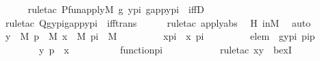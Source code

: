 \begin{isabellebody}
\ \ \ \ \isamarkupfalse%
\ {\isacharparenleft}{\kern0pt}rule{\isacharunderscore}{\kern0pt}tac\ P{\isacharequal}{\kern0pt}{\isachardoublequoteopen}fun{\isacharunderscore}{\kern0pt}apply{\isacharparenleft}{\kern0pt}{\isacharhash}{\kern0pt}{\isacharhash}{\kern0pt}M{\isacharcomma}{\kern0pt}\ g{\isacharcomma}{\kern0pt}\ y{\isacharunderscore}{\kern0pt}pi{\isacharcomma}{\kern0pt}\ g{\isacharunderscore}{\kern0pt}app{\isacharunderscore}{\kern0pt}y{\isacharunderscore}{\kern0pt}pi{\isacharparenright}{\kern0pt}{\isachardoublequoteclose}\ \ iffD{}{\isacharparenright}{\kern0pt}\isanewline
\ \ \ \ \isamarkupfalse%
\ {\isacharparenleft}{\kern0pt}rule{\isacharunderscore}{\kern0pt}tac\ Q{\isacharequal}{\kern0pt}{\isachardoublequoteopen}g{\isacharbackquote}{\kern0pt}y{\isacharunderscore}{\kern0pt}pi{\isacharequal}{\kern0pt}g{\isacharunderscore}{\kern0pt}app{\isacharunderscore}{\kern0pt}y{\isacharunderscore}{\kern0pt}pi{\isachardoublequoteclose}\ \ iff{\isacharunderscore}{\kern0pt}trans{\isacharparenright}{\kern0pt}\isanewline
\ \ \ \ \isamarkupfalse%
\ {\isacharparenleft}{\kern0pt}rule{\isacharunderscore}{\kern0pt}tac\ apply{\isacharunderscore}{\kern0pt}abs{\isacharparenright}{\kern0pt}\ \isamarkupfalse%
\ H\ inM\ \isamarkupfalse%
\ auto\isanewline
\ \ \isamarkupfalse%
\ {\isachardoublequoteopen}{\isacharparenleft}{\kern0pt}{\isasymexists}y\ {\isasymin}\ M{\isachardot}{\kern0pt}\ {\isasymexists}p\ {\isasymin}\ M{\isachardot}{\kern0pt}\ {\isasymexists}x\ {\isasymin}\ M{\isachardot}{\kern0pt}\ {\isasymexists}pi\ {\isasymin}\ M{\isachardot}{\kern0pt}\ \isanewline
\ \ \ \ \ \ \ \ x{\isacharunderscore}{\kern0pt}pi\ {\isacharequal}{\kern0pt}\ {\isacharless}{\kern0pt}x{\isacharcomma}{\kern0pt}\ pi{\isachargreater}{\kern0pt}\ {\isasymand}\isanewline
\ \ \ \ \ \ \ \ elem\ {\isacharequal}{\kern0pt}\ {\isacharless}{\kern0pt}g{\isacharbackquote}{\kern0pt}{\isacharless}{\kern0pt}y{\isacharcomma}{\kern0pt}pi{\isachargreater}{\kern0pt}{\isacharcomma}{\kern0pt}\ pi{\isacharbackquote}{\kern0pt}p{\isachargreater}{\kern0pt}\ {\isasymand}\ \isanewline
\ \ \ \ \ \ \ \ {\isacharless}{\kern0pt}y{\isacharcomma}{\kern0pt}\ p{\isachargreater}{\kern0pt}\ {\isasymin}\ x\ {\isasymand}\ \isanewline
\ \ \ \ \ \ \ \ function{\isacharparenleft}{\kern0pt}pi{\isacharparenright}{\kern0pt}\isanewline
\ \ \ \ \ {\isacharparenright}{\kern0pt}{\isachardoublequoteclose}\isanewline
\ \ \ \ \isamarkupfalse%
\ {\isacharparenleft}{\kern0pt}rule{\isacharunderscore}{\kern0pt}tac\ x{\isacharequal}{\kern0pt}y\ \ bexI{\isacharparenright}{\kern0pt}\ \ \isamarkupfalse%

\end{isabellebody}
